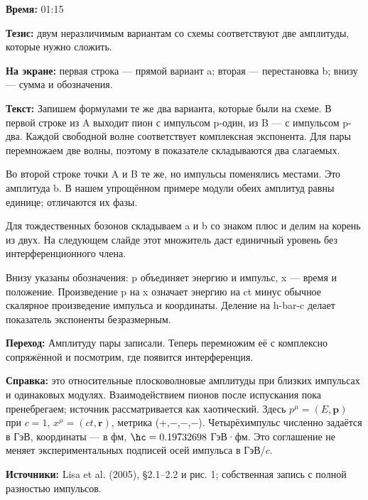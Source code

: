 \textbf{Время:} 01:15

\textbf{Тезис:} двум неразличимым вариантам со схемы соответствуют две амплитуды, которые нужно сложить.

\textbf{На экране:} первая строка — прямой вариант a; вторая — перестановка b; внизу — сумма и обозначения.

\textbf{Текст:} Запишем формулами те же два варианта, которые были на схеме. В первой строке из A выходит пион с импульсом p-один, из B — с импульсом p-два. Каждой свободной волне соответствует комплексная экспонента. Для пары перемножаем две волны, поэтому в показателе складываются два слагаемых.

Во второй строке точки A и B те же, но импульсы поменялись местами. Это амплитуда b. В нашем упрощённом примере модули обеих амплитуд равны единице; отличаются их фазы.

Для тождественных бозонов складываем a и b со знаком плюс и делим на корень из двух. На следующем слайде этот множитель даст единичный уровень без интерференционного члена.

Внизу указаны обозначения: p объединяет энергию и импульс, x — время и положение. Произведение p на x означает энергию на ct минус обычное скалярное произведение импульса и координаты. Деление на h-bar-c делает показатель экспоненты безразмерным.

\textbf{Переход:} Амплитуду пары записали. Теперь перемножим её с комплексно сопряжённой и посмотрим, где появится интерференция.

\textbf{Справка:} это относительные плосковолновые амплитуды при близких импульсах и одинаковых модулях. Взаимодействием пионов после испускания пока пренебрегаем; источник рассматривается как хаотический. Здесь \(p^\mu=(E,\mathbf p)\) при \(c=1\), \(x^\mu=(ct,\mathbf r)\), метрика (+,−,−,−). Четырёхимпульс численно задаётся в ГэВ, координаты — в фм, \(\hc=0.19732698\) ГэВ·фм. Это соглашение не меняет экспериментальных подписей осей импульса в ГэВ/\(c\).

\textbf{Источники:} Lisa et al. (2005), §2.1–2.2 и рис. 1; собственная запись с полной разностью импульсов.
